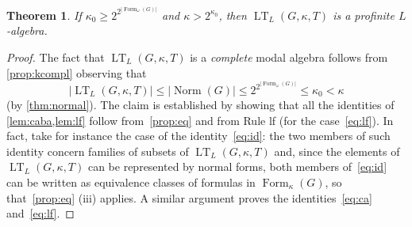 \documentclass{article}
\newtheorem{thm}{Theorem}
\theoremstyle{definition}
\DeclareMathOperator{\LT}{LT}
\DeclareMathOperator{\Formulas}{Form}
\DeclareMathOperator{\Norm}{Norm}
\begin{document}
\begin{thm}\label{thm:pro}
If 
$\kappa_0 \geq 2^{2^{|\Formulas_\omega(G)|}}$ and $\kappa> 2^{\kappa_0}$, 
then $\LT_L(G,\kappa,T)$ is a profinite $L$-algebra.
\end{thm}
\begin{proof}
The fact that $\LT_L(G,\kappa,T)$ is a \emph{complete} modal algebra follows from \cref{prop:kcompl} observing that
$$|\LT_L(G,\kappa,T)| \leq |\Norm(G)| \leq 2^{2^{|\Formulas_\omega(G)|}} \leq \kappa_0 < \kappa$$
(by \cref{thm:normal}). The claim is established by showing that 
all the identities of \cref{lem:caba,lem:lf} 
follow from~\cref{prop:eq} and from Rule lf (for the case~\eqref{eq:lf}). 
In fact, take for instance the case of the identity~\eqref{eq:id}: the two members of such identity concern families of subsets of $\LT_L(G,\kappa,T)$ and, since the elements of  $\LT_L(G,\kappa,T)$ can be represented by  normal forms, both members of~\eqref{eq:id} can be written as equivalence classes of formulas in $\Formulas_\kappa(G)$, so that~\cref{prop:eq} (iii) applies.          
A similar argument proves the identities~\eqref{eq:ca} and~\eqref{eq:lf}.

\end{proof}
\end{document}

